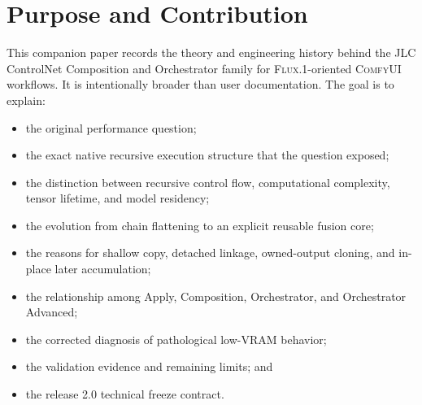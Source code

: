 \documentclass[11pt]{article}
\newcommand{\FluxOne}{\textsc{Flux.1}}
\newcommand{\ComfyUI}{\textsc{ComfyUI}}
\newcommand{\JLC}{\textsc{JLC}}
\begin{document}
\begin{abstract}
The architecture supports three workflow interfaces with one fusion theory: Composition linearizes an existing native chain; Orchestrator accepts external ControlNet objects and prepares independent slots; Orchestrator Advanced performs internal model selection, strict preflight, shared-cache reuse, dynamic slot management, and per-run copy isolation. Current validation on an RTX 4090 Laptop with 16~GB VRAM demonstrated stable heavy \FluxOne{} workloads with Union Pro ControlNet, 304 attached LoRA patches, repeated or distinct controls, and as many as four active slots, without model-unload cascades during sampling. Representative 35-step runs completed in approximately 188--202 seconds, while an upper comfort-limit 3.15-megapixel, 50-step run completed in 31:03 sampling time without a full-model unload/reload cascade.

The release 2.0 freeze therefore preserves both parts of the lesson: explicit non-recursive linearization is a useful execution and ownership model, but it must cooperate with rather than replace \ComfyUI{} model management. The community contribution is not the claim that recursion is inherently defective. It is a precise alternative formulation for multi-ControlNet residual fusion, accompanied by a corrected understanding of performance, memory residency, hint preparation, caching, and DynamicVRAM behavior.
\end{abstract}

\tableofcontents
\newpage

\section{Purpose and Contribution}

This companion paper records the theory and engineering history behind the \JLC{} ControlNet Composition and Orchestrator family for \FluxOne{}-oriented \ComfyUI{} workflows. It is intentionally broader than user documentation. The goal is to explain:

\begin{itemize}
  \item the original performance question;
  \item the exact native recursive execution structure that the question exposed;
  \item the distinction between recursive control flow, computational complexity, tensor lifetime, and model residency;
  \item the evolution from chain flattening to an explicit reusable fusion core;
  \item the reasons for shallow copy, detached linkage, owned-output cloning, and in-place later accumulation;
  \item the relationship among Apply, Composition, Orchestrator, and Orchestrator Advanced;
  \item the corrected diagnosis of pathological low-VRAM behavior;
  \item the validation evidence and remaining limits; and
  \item the release 2.0 technical freeze contract.
\end{itemize}
\end{document}
